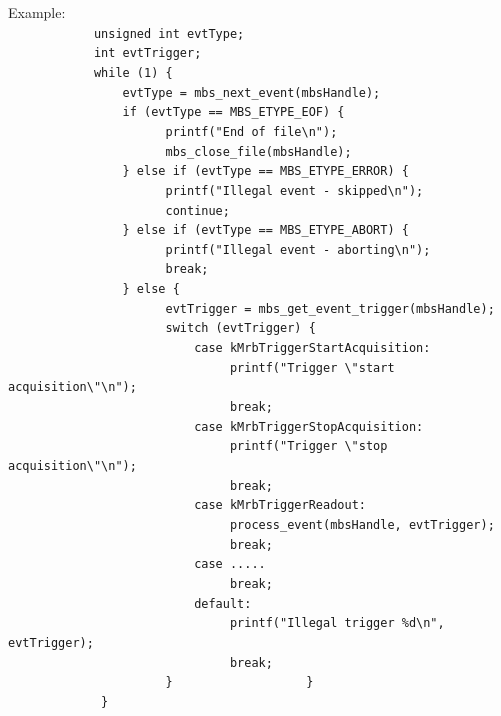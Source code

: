 \documentclass[10pt]{article}
\newenvironment{yellowboxed}
	{\begin{Sbox}\begin{minipage}[t]}
	{\end{minipage}\end{Sbox}\colorbox{yellow}{\TheSbox}}
\begin{document}
\begin{yellowboxed}{\linewidth}
Example:\\
\verb+            unsigned int evtType;+\\
\verb+            int evtTrigger;+\\
\verb+            while (1) {+\\
\verb+                evtType = mbs_next_event(mbsHandle);+\\
\verb+                if (evtType == MBS_ETYPE_EOF) {+\\
\verb+                      printf("End of file\n");+\\
\verb+                      mbs_close_file(mbsHandle);+\\
\verb+                } else if (evtType == MBS_ETYPE_ERROR) {+\\
\verb+                      printf("Illegal event - skipped\n");+\\
\verb+                      continue;+\\
\verb+                } else if (evtType == MBS_ETYPE_ABORT) {+\\
\verb+                      printf("Illegal event - aborting\n");+\\
\verb+                      break;+\\
\verb+                } else {+\\
\verb+                      evtTrigger = mbs_get_event_trigger(mbsHandle);+\\
\verb+                      switch (evtTrigger) {+\\
\verb+                          case kMrbTriggerStartAcquisition:+\\
\verb+                               printf("Trigger \"start acquisition\"\n");+\\
\verb+                               break;+\\
\verb+                          case kMrbTriggerStopAcquisition:+\\
\verb+                               printf("Trigger \"stop acquisition\"\n");+\\
\verb+                               break;+\\
\verb+                          case kMrbTriggerReadout:+\\
\verb+                               process_event(mbsHandle, evtTrigger);+\\
\verb+                               break;+\\
\verb+                          case .....+\\
\verb+                               break;+\\
\verb+                          default:+\\
\verb+                               printf("Illegal trigger %d\n", evtTrigger);+\\
\verb+                               break;+\\
\verb+                      }+
\verb+                  }+\\
\verb+             }+
\end{yellowboxed}
\newpage
\end{document}
